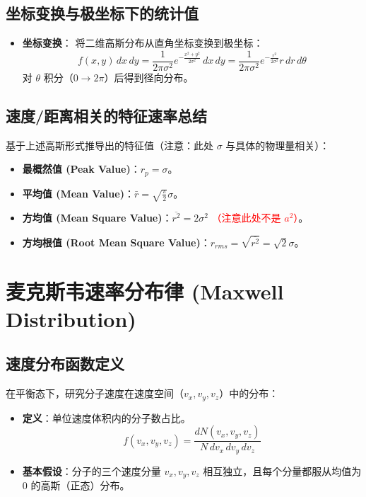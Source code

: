 \documentclass{article}
\begin{document}
\subsection{坐标变换与极坐标下的统计值}
\begin{itemize}
    \item \textbf{坐标变换}：
    将二维高斯分布从直角坐标变换到极坐标：
    \[ f(x, y) \, dx \, dy = \frac{1}{2\pi\sigma^2} e^{-\frac{x^2+y^2}{2\sigma^2}} \, dx \, dy = \frac{1}{2\pi\sigma^2} e^{-\frac{r^2}{2\sigma^2}} r \, dr \, d\theta \]
    对 $\theta$ 积分（$0 \to 2\pi$）后得到径向分布。
\end{itemize}

\subsection{速度/距离相关的特征速率总结}
基于上述高斯形式推导出的特征值（注意：此处 $\sigma$ 与具体的物理量相关）：
\begin{itemize}
    \item \textbf{最概然值 (Peak Value)}：$r_p = \sigma$。
    \item \textbf{平均值 (Mean Value)}：$\bar{r} = \sqrt{\frac{\pi}{2}} \sigma$。
    \item \textbf{方均值 (Mean Square Value)}：$\overline{r^2} = 2\sigma^2$ \textcolor{red}{（注意此处不是 $a^2$）}。
    \item \textbf{方均根值 (Root Mean Square Value)}：$r_{rms} = \sqrt{\overline{r^2}} = \sqrt{2} \sigma$。
\end{itemize}

\section{麦克斯韦速率分布律 (Maxwell Distribution)}

\subsection{速度分布函数定义}
在平衡态下，研究分子速度在速度空间（$v_x, v_y, v_z$）中的分布：
\begin{itemize}
    \item \textbf{定义}：单位速度体积内的分子数占比。
    \[ f(v_x, v_y, v_z) = \frac{dN(v_x, v_y, v_z)}{N \, dv_x \, dv_y \, dv_z} \]
    \item \textbf{基本假设}：分子的三个速度分量 $v_x, v_y, v_z$ 相互独立，且每个分量都服从均值为 0 的高斯（正态）分布。
\end{itemize}
\end{document}
